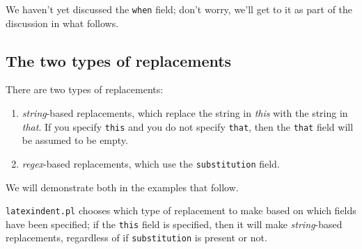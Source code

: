  We haven't yet discussed the \texttt{when} field; don't worry, we'll get to it as part of
 the discussion in what follows.

\subsection{The two types of replacements}
 There are two types of replacements:
 \begin{enumerate}
  \item \emph{string}-based replacements, which replace the string in
        \emph{this} with the string in \emph{that}.
        If you specify \texttt{this} and you do not specify \texttt{that}, then the \texttt{that}
        field will be assumed to be empty.
  \item \emph{regex}-based replacements, which use the \texttt{substitution} field.
 \end{enumerate}
 We will demonstrate both in the examples that follow.

 \texttt{latexindent.pl} chooses which type of replacement to make based on which fields
 have been specified; if the \texttt{this} field is specified, then it will make
 \emph{string}-based replacements, regardless of if \texttt{substitution} is present or
 not.


